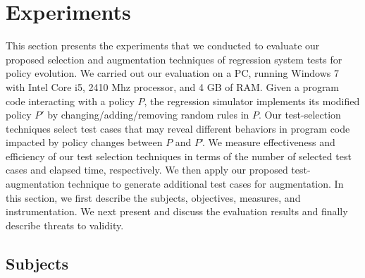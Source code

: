 % 		     
%


\section{Experiments}\label{sec:experiment}


This section presents the experiments that we conducted to evaluate our proposed
selection and augmentation techniques of regression system tests for policy
evolution. We carried out our evaluation on a PC, running Windows 7 with Intel Core i5, 2410 Mhz processor, and 4 GB of RAM. 
Given a program code interacting with a policy $P$, the regression simulator implements its modified
policy $P'$ by changing/adding/removing random rules in $P$. Our test-selection techniques select test cases that may reveal different behaviors in program code impacted
by policy changes between $P$ and $P$'. We measure effectiveness and efficiency of our test selection techniques in terms of the number of selected 
test cases and elapsed time, respectively. We then apply our proposed test-augmentation technique to generate additional test cases
for augmentation. In this section, we first describe the subjects, objectives, measures, and instrumentation. We next present and discuss the evaluation results
and finally describe threats to validity.


\subsection{Subjects}

